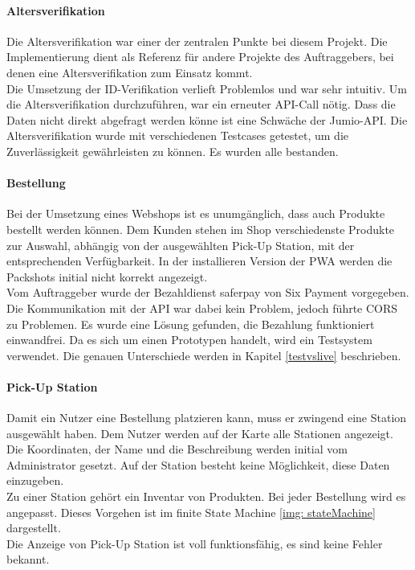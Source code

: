 \paragraph{Altersverifikation}
Die Altersverifikation war einer der zentralen Punkte bei diesem Projekt. Die Implementierung dient als Referenz für andere Projekte des Auftraggebers, bei denen eine Altersverifikation zum Einsatz kommt. \\
Die Umsetzung der ID-Verifikation verlieft Problemlos und war sehr intuitiv. Um die Altersverifikation durchzuführen, war ein erneuter API-Call nötig. Dass die Daten nicht direkt abgefragt werden könne ist eine Schwäche der Jumio-API. Die Altersverifikation wurde mit verschiedenen Testcases getestet, um die Zuverlässigkeit gewährleisten zu können. Es wurden alle bestanden. 

\paragraph{Bestellung}
Bei der Umsetzung eines Webshops ist es unumgänglich, dass auch Produkte bestellt werden können. Dem Kunden stehen im Shop verschiedenste Produkte zur Auswahl, abhängig von der ausgewählten Pick-Up Station, mit der entsprechenden Verfügbarkeit. In der installieren Version der \ac{PWA} werden die Packshots initial nicht korrekt angezeigt. \\Vom Auftraggeber wurde der Bezahldienst saferpay von Six Payment vorgegeben. Die Kommunikation mit der API war dabei kein Problem, jedoch führte \ac{CORS} zu Problemen. Es wurde eine Lösung gefunden, die Bezahlung funktioniert einwandfrei. Da es sich um einen Prototypen handelt, wird ein Testsystem verwendet. Die genauen Unterschiede werden in Kapitel \ref{testvslive} beschrieben. \\

\paragraph{Pick-Up Station}
Damit ein Nutzer eine Bestellung platzieren kann, muss er zwingend eine Station ausgewählt haben. Dem Nutzer werden auf der Karte alle Stationen angezeigt. Die Koordinaten, der Name und die Beschreibung werden initial vom Administrator gesetzt. Auf der Station besteht keine Möglichkeit, diese Daten einzugeben. \\Zu einer Station gehört ein Inventar von Produkten. Bei jeder Bestellung wird es angepasst. Dieses Vorgehen ist im finite State Machine \ref{img: stateMachine} dargestellt.\\
Die Anzeige von Pick-Up Station ist voll funktionsfähig, es sind keine Fehler bekannt. 

